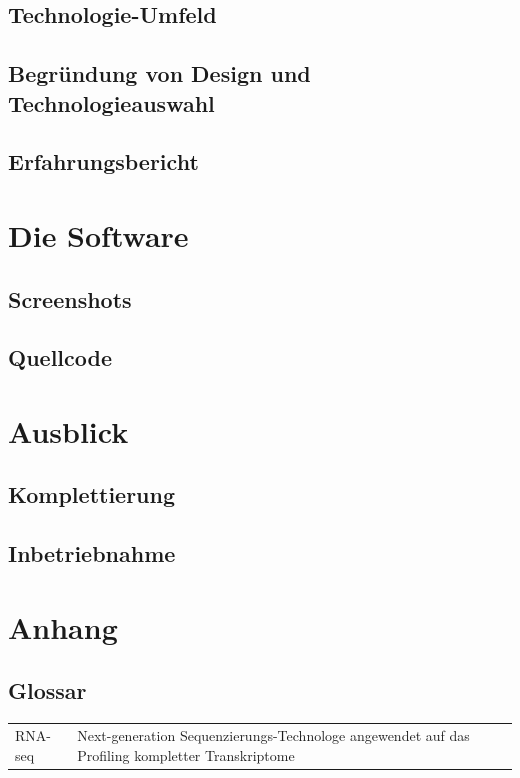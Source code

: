 \documentclass[a4paper]{thesis}
\begin{document}
\subsection{Technologie-Umfeld}

\subsection{Begründung von Design und Technologieauswahl}

\subsection{Erfahrungsbericht}

\section{Die Software}

\subsection{Screenshots}

\subsection{Quellcode}


\paragraphmark{}

\section{Ausblick}

\subsection{Komplettierung}

\subsection{Inbetriebnahme}

\section{Anhang}

\subsection{Glossar}

\begin{tabularx}{\textwidth}{lX}
	  RNA-seq
	& Next-generation Sequenzierungs-Technologe angewendet auf
          das Profiling kompletter Transkriptome
\\
\end{tabularx}

\end{document}
